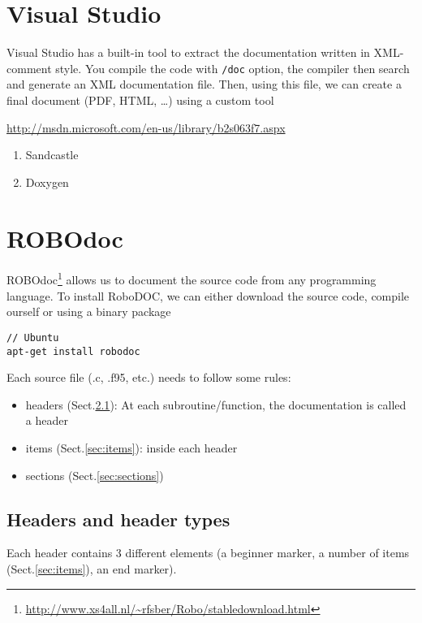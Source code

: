 \section{Visual Studio}

Visual Studio has a built-in tool to extract the documentation written in
XML-comment style. You compile the code with \verb!/doc! option, the compiler
then search and generate an XML documentation file. Then, using this file, we
can create a final document (PDF, HTML, \ldots) using a custom tool

\url{http://msdn.microsoft.com/en-us/library/b2s063f7.aspx}
\begin{enumerate}
  \item Sandcastle
  \item Doxygen
\end{enumerate}

\section{ROBOdoc}
\label{sec:robodoc}


ROBOdoc\footnote{\url{http://www.xs4all.nl/~rfsber/Robo/stabledownload.html}}
allows us to document the source code from any programming
language. To install RoboDOC, we can either download the source code, compile
ourself or using a binary package
\begin{verbatim}
// Ubuntu
apt-get install robodoc
\end{verbatim}


Each source file (.c, .f95, etc.) needs to follow some rules:
\begin{itemize}
\item headers (Sect.\ref{sec:headers}): At each subroutine/function, the
documentation is called a header
\item items (Sect.\ref{sec:items}): inside each header
\item sections (Sect.\ref{sec:sections})
\end{itemize}

\subsection{Headers and header types}
\label{sec:headers}

Each header contains 3 different elements (a beginner marker, a number
of items (Sect.\ref{sec:items}), an end marker). 

